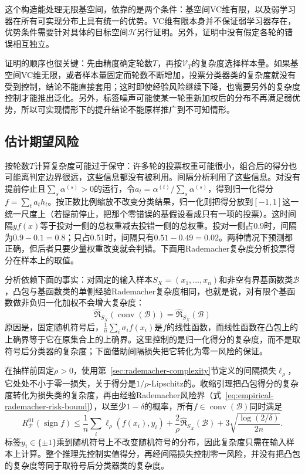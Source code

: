 这个构造能处理无限基空间，依靠的是两个条件：基空间VC维有限，以及弱学习器在所有可实现分布上具有统一的优势。VC维有限本身并不保证弱学习器存在，优势条件需要针对具体的目标空间$\mathcal H$另行证明。另外，证明中没有假定各轮的错误相互独立。

证明的顺序也很关键：先由精度确定轮数$T$，再按$\mathcal V_T$的复杂度选择样本量。如果基空间VC维无限，或者样本量固定而轮数不断增加，投票分类器类的复杂度就没有受到控制，结论不能直接套用；这时即使经验风险继续下降，也需要另外的复杂度控制才能推出泛化。另外，标签噪声可能使某一轮重新加权后的分布不再满足弱优势，所以可实现情形下的提升结论不能原样推广到不可知情形。

\subsection{估计期望风险}

按轮数$T$计算复杂度可能过于保守：许多轮的投票权重可能很小，组合后的得分也可能离判定边界很远，这些信息都没有被利用。间隔分析利用了这些信息。对没有提前停止且$\sum_s\alpha^{(s)}>0$的运行，令$a_t=\alpha^{(t)}/\sum_s\alpha^{(s)}$，得到归一化得分$f=\sum_ta_th_t$。按正数比例缩放不改变分类结果，归一化则把得分放到$[-1,1]$这一统一尺度上（若提前停止，把那个零错误的基假设看成只有一项的投票）。这时间隔$yf(x)$等于投对一侧的总权重减去投错一侧的总权重。投对一侧占0.9时，间隔为$0.9-0.1=0.8$；只占0.51时，间隔只有$0.51-0.49=0.02$。两种情况下预测都正确，但后者只要少量权重改变就会判错。下面用Rademacher复杂度分析投票得分在样本上的取值。

\label{thm:learning-ensemble-convex-hull}
分析依赖下面的事实：对固定的输入样本$S_X=(x_1,\ldots,x_n)$和非空有界基函数类$\mathcal B$，凸包与基函数类的单侧经验Rademacher复杂度相同，也就是说，对有限个基函数做非负归一化加权不会增大复杂度：
\[
 \widehat{\mathfrak R}_{S_X}(\operatorname{conv}(\mathcal B))
 =\widehat{\mathfrak R}_{S_X}(\mathcal B)
\]
原因是，固定随机符号后，$\frac1n\sum_i\sigma_if(x_i)$是$f$的线性函数，而线性函数在凸包上的上确界等于它在原集合上的上确界。这里控制的是归一化得分的复杂度，而不是取符号后分类器的复杂度；下面借助间隔损失把它转化为零一风险的保证。

在抽样前固定$\rho>0$，使用第~\ref{sec:rademacher-complexity}节定义的间隔损失$\ell_\rho$，它处处不小于零一损失，关于得分是$1/\rho$-Lipschitz的。收缩引理把凸包得分的复杂度转化为损失类的复杂度，再由经验Rademacher风险界（式~\eqref{eq:empirical-rademacher-risk-bound}），以至少$1-\delta$的概率，所有$f\in\operatorname{conv}(\mathcal B)$同时满足
\begin{equation}
 R_{\mathcal P}^{01}(\operatorname{sign}f)
 \leq\frac1n\sum_i\ell_\rho(f(x_i),y_i)
 +\frac{2}{\rho}\widehat{\mathfrak R}_{S_X}(\mathcal B)
 +3\sqrt{\frac{\log(2/\delta)}{2n}}.
 \label{eq:ensemble-margin-bound}
\end{equation}
标签$y_i\in\{\pm1\}$乘到随机符号上不改变随机符号的分布，因此复杂度只需在输入样本上计算。整个推理先控制实值得分，再经间隔损失控制零一风险，并没有把凸包的复杂度等同于取符号后分类器类的复杂度。

